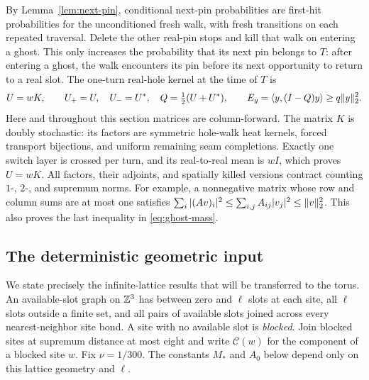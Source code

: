 By Lemma~\ref{lem:next-pin}, conditional next-pin probabilities are
first-hit probabilities for the unconditioned fresh walk, with fresh
transitions on each repeated traversal.  Delete the other real-pin
stops and kill that walk on entering a ghost.  This only increases the
probability that its next pin belongs to \(T\): after entering a ghost,
the walk encounters its pin before its next opportunity to return to a
real slot.  The one-turn real-hole kernel at the time of \(T\) is
\begin{equation}\label{eq:ghost-mass}
 U=wK,\qquad U_+=U,\quad U_-=U^*,\quad Q=\tfrac12(U+U^*),
 \qquad E_y=\langle y,(I-Q)y\rangle\ge q\lVert y\rVert_2^2.
\end{equation}
Here and throughout this section matrices are column-forward.
The matrix \(K\) is doubly stochastic: its factors are symmetric
hole-walk heat kernels, forced transport bijections, and uniform
remaining seam completions.  Exactly one switch layer is crossed per
turn, and its real-to-real mean is \(wI\), which proves \(U=wK\).
All factors, their adjoints, and spatially killed versions contract
counting \(1\)-, \(2\)-, and supremum norms.  For example, a
nonnegative matrix whose row and column sums are at most one satisfies
\(\sum_i|(Av)_i|^2\le\sum_{i,j}A_{ij}|v_j|^2\le\lVert v\rVert_2^2\).
This also proves the last inequality in \eqref{eq:ghost-mass}.

\subsection{The deterministic geometric input}

We state precisely the infinite-lattice results that will be transferred
to the torus.  An available-slot graph on \(\mathbb Z^3\) has between zero
and \(\ell\) slots at each site, all \(\ell\) slots outside a finite
set, and all pairs of available slots joined across every
nearest-neighbor site bond.  A site with no available slot is
\emph{blocked}.  Join blocked sites at supremum distance at most eight
and write \(\mathcal C(w)\) for the component of a blocked site \(w\).
Fix \(\nu=1/300\).  The constants \(M_*\) and \(A_0\) below depend
only on this lattice geometry and \(\ell\).

